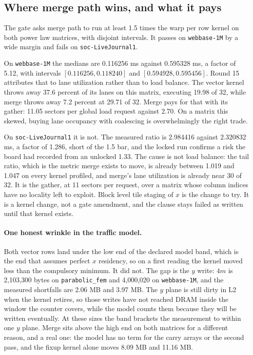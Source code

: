 \subsection{Where merge path wins, and what it pays}
\label{sec:spmvgate}

The gate asks merge path to run at least 1.5 times the warp per row kernel on both
power law matrices, with disjoint intervals. It passes on \texttt{webbase-1M} by a
wide margin and fails on \texttt{soc-LiveJournal1}.

On \texttt{webbase-1M} the medians are 0.116256 ms against 0.595328 ms, a factor of
5.12, with intervals $[0.116256, 0.118240]$ and $[0.594928, 0.595456]$. Round 15
attributes that to lane utilization rather than to load balance. The vector kernel
throws away 37.6 percent of its lanes on this matrix, executing 19.98 of 32, while
merge throws away 7.2 percent at 29.71 of 32. Merge pays for that with its gather:
11.05 sectors per global load request against 2.70. On a matrix this skewed, buying
lane occupancy with coalescing is overwhelmingly the right trade.

On \texttt{soc-LiveJournal1} it is not. The measured ratio is 2.984416 against
2.320832 ms, a factor of 1.286, short of the 1.5 bar, and the locked run confirms a
risk the board had recorded from an unlocked 1.33. The cause is not load balance:
the tail ratio, which is the metric merge exists to move, is already between 1.019
and 1.047 on every kernel profiled, and merge's lane utilization is already near 30
of 32. It is the gather, at 11 sectors per request, over a matrix whose column
indices have no locality left to exploit. Block level tile staging of $x$ is the
change to try. It is a kernel change, not a gate amendment, and the clause stays
failed as written until that kernel exists.

\paragraph{One honest wrinkle in the traffic model.} Both vector rows land under
the low end of the declared model band, which is the end that assumes perfect $x$
residency, so on a first reading the kernel moved less than the compulsory minimum.
It did not. The gap is the $y$ write: $4m$ is 2,103,300 bytes on
\texttt{parabolic\_fem} and 4,000,020 on \texttt{webbase-1M}, and the measured
shortfalls are 2.06 MB and 3.97 MB. The $y$ plane is still dirty in L2 when the
kernel retires, so those writes have not reached DRAM inside the window the counter
covers, while the model counts them because they will be written eventually. At
these sizes the band brackets the measurement to within one $y$ plane. Merge sits
above the high end on both matrices for a different reason, and a real one: the
model has no term for the carry arrays or the second pass, and the fixup kernel
alone moves 8.09 MB and 11.16 MB.
